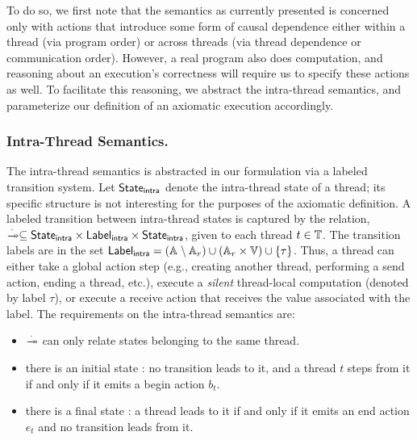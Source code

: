 To do so, we first note that the semantics as currently presented is concerned
only with actions that introduce some form of causal dependence either within a
thread (via program order) or across threads (via thread dependence or
communication order). However, a real program also does computation, and
reasoning about an execution's correctness will require us to specify these
actions as well. To facilitate this reasoning, we abstract the intra-thread
semantics, and parameterize our definition of an axiomatic execution accordingly.

\subsubsection{Intra-Thread Semantics.} The intra-thread semantics is abstracted
in our formulation via a labeled transition system.  Let ${\sf State}_{\sf intra}$ denote
the intra-thread state of a thread; its specific structure is not interesting
for the purposes of the axiomatic definition. A labeled transition between
intra-thread states is captured by the relation, $\intratrans{.} \subseteq
\intrastate \times \intralabel \times \intrastate$, given to each thread $t \in
\mathbb{T}$. The transition labels are in the set ${\sf Label}_{\sf intra} =
(\mathbb{A}_{} \setminus \mathbb{A}_{r}) \cup (\mathbb{A}_{r} \times
\mathbb{V}) \cup \{\tau\}$.  Thus, a thread can either take a global action
step (e.g., creating another thread, performing a send action, ending a thread,
etc.), execute a \emph{silent} thread-local computation (denoted by label
$\tau$), or execute a receive action that receives the value associated with
the label. The requirements on the intra-thread semantics are:

\begin{itemize}
\item $\intratrans{.}$ can only relate states belonging to the same thread.
\item there is an initial state \ready: no transition leads to it,
	and a thread $t$ steps from it if and only if it emits a begin action $b_t$.
\item there is a final state \done: a thread leads to it if and only if it
	emits an end action $e_t$ and no transition leads from it.
\end{itemize}

